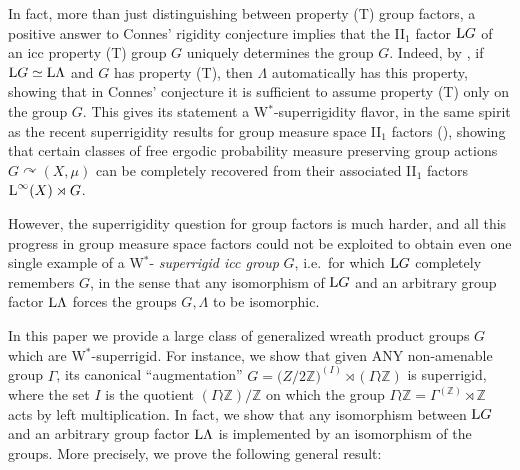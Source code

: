 \documentclass[a4paper,11pt]{amsart}
\numberwithin{equation}{section}
\begin{document}
In fact, more than just distinguishing between property (T) group
factors, a positive answer to Connes' rigidity conjecture implies
that the II$_1$ factor ${\mathord{\text{\rm L}}} G$ of an icc property (T) group $G$
uniquely determines the group $G$. Indeed, by \cite{CJ83}, if ${\mathord{\text{\rm L}}} G
\simeq {\mathord{\text{\rm L}}} \Lambda$ and $G$ has property (T), then $\Lambda$
automatically has this property, showing that in Connes' conjecture
it is sufficient to assume property (T) only on the group $G$. This
gives its statement a W$^*$-superrigidity flavor, in the same spirit
as the recent superrigidity results for group measure space II$_1$
factors (\cite{PV09,Io10}), showing that certain classes of free
ergodic probability measure preserving group actions $G {\curvearrowright}
(X,\mu)$ can be completely recovered from their associated II$_1$
factors ${\mathord{\text{\rm L}}}^\infty(X) \rtimes G$.

However, the superrigidity question for group factors is much
harder, and all this progress in group measure space factors could
not be exploited to obtain even one single example of a W$^*$-{\it
superrigid icc group} $G$, i.e.\ for which ${\mathord{\text{\rm L}}} G$ completely
remembers $G$, in the sense that any isomorphism of ${\mathord{\text{\rm L}}} G$ and an
arbitrary group factor ${\mathord{\text{\rm L}}} \Lambda$ forces the groups $G, \Lambda$
to be isomorphic.

In this paper we provide a large class of generalized wreath product
groups $G$ which are W$^*$-superrigid. For instance, we show that
given ANY non-amenable group $\Gamma$, its canonical
``augmentation'' $G = \mathbb (Z/2\mathbb Z)^{(I)} \rtimes
(\Gamma\wr \mathbb Z)$ is superrigid, where the set $I$ is the
quotient $(\Gamma\wr \mathbb Z)/\mathbb Z$ on which the group
$\Gamma\wr \mathbb Z=\Gamma^{(\mathbb Z)}\rtimes \mathbb Z$ acts by
left multiplication. In fact, we show that any isomorphism between
${\mathord{\text{\rm L}}} G$ and an arbitrary group factor ${\mathord{\text{\rm L}}} \Lambda$ is implemented
by an isomorphism of the groups. More precisely, we prove the
following general result:
\end{document}
